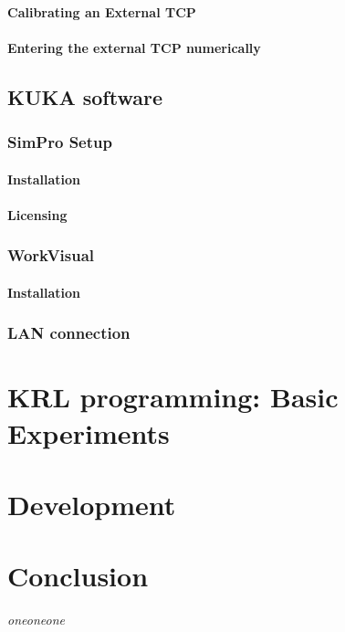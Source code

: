 \documentclass{book}
\begin{document}
				\subsubsection{Calibrating an External TCP}
				\subsubsection{Entering the external TCP numerically}
			
			\section{KUKA software}
				\subsection{SimPro Setup}
					\subsubsection{Installation}
					\subsubsection{Licensing}
				\subsection{WorkVisual}
					\subsubsection{Installation}
					\subsection{LAN connection}
		
		
		\chapter{KRL programming: Basic Experiments}
		
		
		
		\chapter{Development}
		
		
		\chapter{Conclusion}
		
		\begin{thebibliography}
			\textit{oneoneone}
			
		\end{thebibliography}
\end{document}
